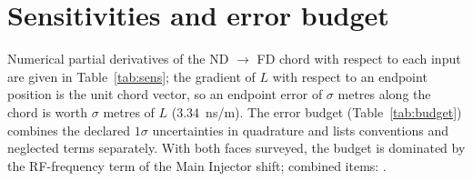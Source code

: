 \documentclass[11pt,letterpaper]{article}
\newcommand{\ND}{ND}
\newcommand{\FD}{FD}
\begin{document}
\begin{table}[htbp]\centering\small
\caption{Validation against published and surveyed quantities.}
\label{tab:validation}
\end{table}

\section{Sensitivities and error budget}
Numerical partial derivatives of the \ND{} $\to$ \FD{} chord with respect to each input are given in Table~\ref{tab:sens}; the gradient of $L$ with respect to an endpoint position is the unit chord vector, so an endpoint error of $\sigma$ metres along the chord is worth $\sigma$ metres of $L$ (\SI{3.34}{ns/m}).  The error budget (Table~\ref{tab:budget}) combines the declared $1\sigma$ uncertainties in quadrature and lists conventions and neglected terms separately.  With both faces surveyed, the budget is dominated by the RF-frequency term of the Main Injector shift; combined items: .

\begin{table}[htbp]\centering\scriptsize
\caption{Sensitivities of the \ND{} $\to$ \FD{} chord.}
\label{tab:sens}
\end{table}
\begin{table}[htbp]\centering\small
\caption{Error budget, \ND{} face $\to$ \FD{} face, in \SI{64}{MHz} ticks.}
\label{tab:budget}
\end{table}
\end{document}
